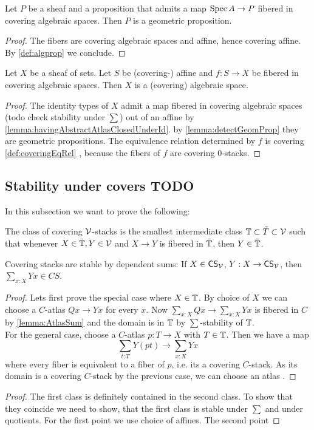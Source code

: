 \begin{lemma}{\label{lemma:detectGeomProp}}
	Let $P$ be a sheaf and a proposition that admits a map $\operatorname{Spec} A \to P$ fibered in covering algebraic spaces. Then $P$ is a geometric proposition.
\end{lemma}
\begin{proof}
	The fibers are covering algebraic spaces and affine, hence covering affine. By \ref{def:algprop} we conclude.
\end{proof}
\begin{theorem}
	Let $X$ be a sheaf of sets. Let $S$ be (covering-) affine and $f : S \to X$ be fibered in covering algebraic spaces. Then $X$ is a (covering) algebraic space.
\end{theorem}
\begin{proof}
	The identity types of $X$ admit a map fibered in covering algebraic spaces (todo check stability under $\sum$) out of an affine by \ref{lemma:havingAbstractAtlasClosedUnderId}. by \ref{lemma:detectGeomProp} they are geometric propositions. The equivalence relation determined by $f$ is covering \ref{def:coveringEqRel} , because the fibers of $f$ are covering 0-stacks.
\end{proof}


\subsection{Stability under covers TODO}
In this subsection we want to prove the following:
\begin{theorem}[TODO]
	The class of covering $\mathcal{V}$-stacks is the smallest intermediate class $\mathbb{T} \subset \tilde T \subset \mathcal{V}$ such that whenever $X \in \tilde {\mathbb{T}}, Y \in \mathcal{V}$ and $X \to Y$ is fibered in $\tilde {\mathbb{T}}$, then $Y \in \tilde {\mathbb{T}}$.
\end{theorem}

\begin{lemma}
	Covering stacks are stable by dependent sums: If $X \in \mathsf{CS}_{\mathcal{V}}$, $Y : X \to \mathsf{CS}_{\mathcal{V}}$, then $\sum_{x: X} Y x \in CS$.
\end{lemma}
\begin{proof}
	Lets first prove the special case where $X \in \mathbb{T}$. By choice of $X$ we can choose a $C$-atlas $Q x \to Y x$ for every $x$. Now $\sum_{x : X} Q x \to \sum_{x: X} Y x$ is fibered in $C$ by \ref{lemma:AtlasSum} and the domain is in $\mathbb{T}$ by $\sum$-stability of $\mathbb{T}$. \\
	For the general case, choose a $C$-atlas $p : T \to X$ with $T \in \mathbb{T}$. Then we have a map
	\[
	\sum_{t : T} Y (p t) \to \sum_{x : X} Y x
	\]
	where every fiber is equivalent to a fiber of $p$, i.e. its a covering $C$-stack. As its domain is a covering $C$-stack by the previous case, we can choose an atlas .
\end{proof}
\begin{proof}
	The first class is definitely contained in the second class. To show that they coincide we need to show, that the first class is stable under $\sum$ and under quotients. For the first point we use choice of affines. The second point 
\end{proof}


